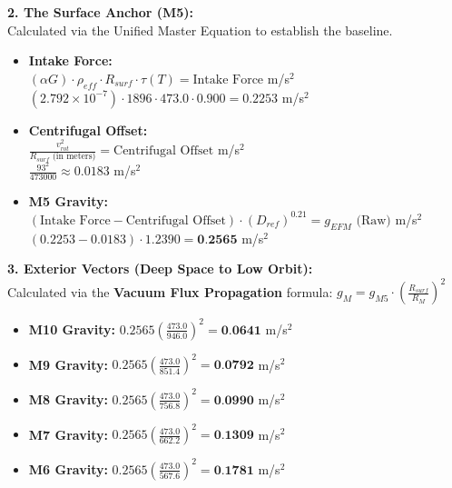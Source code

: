 \documentclass[11pt, a4paper]{article}
\begin{document}
  \vspace{1.0em}
  \noindent \textbf{2. The Surface Anchor (M5):} \\
  \hspace*{1em} Calculated via the Unified Master Equation to establish the baseline.
  \begin{itemize}
    \item \textbf{Intake Force:} \\[0.5em]
    \hspace*{2em} $(\alpha G) \cdot \rho_{eff} \cdot R_{surf} \cdot \tau(T) = \text{Intake Force}$ m/s$^2$ \\[1em]
    \hspace*{2em} $(2.792 \times 10^{-7}) \cdot 1896 \cdot 473.0 \cdot 0.900 = 0.2253$ m/s$^2$
    
    \item \textbf{Centrifugal Offset:} \\[0.5em]
    \hspace*{2em} $\frac{v_{rot}^2}{R_{surf} \text{ (in meters)}} = \text{Centrifugal Offset}$ m/s$^2$ \\[1em]
    \hspace*{2em} $\frac{93^2}{473000} \approx 0.0183$ m/s$^2$
    
    \item \textbf{M5 Gravity:} \\[0.5em]
    \hspace*{2em} $(\text{Intake Force} - \text{Centrifugal Offset}) \cdot (D_{ref})^{0.21} = g_{EFM} \text{ (Raw)}$ m/s$^2$ \\[1em]
    \hspace*{2em} $(0.2253 - 0.0183) \cdot 1.2390 = \textbf{0.2565}$ m/s$^2$
  \end{itemize}

  \clearpage
  \noindent \textbf{3. Exterior Vectors (Deep Space to Low Orbit):} \\
  \hspace*{1em} Calculated via the \textbf{Vacuum Flux Propagation} formula: $g_M = g_{M5} \cdot \left( \frac{R_{surf}}{R_M} \right)^2$
  \begin{itemize}
    \item \textbf{M10 Gravity:} $0.2565 \left( \frac{473.0}{946.0} \right)^2 = \textbf{0.0641}$ m/s$^2$
    \item \textbf{M9 Gravity:} $0.2565 \left( \frac{473.0}{851.4} \right)^2 = \textbf{0.0792}$ m/s$^2$
    \item \textbf{M8 Gravity:} $0.2565 \left( \frac{473.0}{756.8} \right)^2 = \textbf{0.0990}$ m/s$^2$
    \item \textbf{M7 Gravity:} $0.2565 \left( \frac{473.0}{662.2} \right)^2 = \textbf{0.1309}$ m/s$^2$
    \item \textbf{M6 Gravity:} $0.2565 \left( \frac{473.0}{567.6} \right)^2 = \textbf{0.1781}$ m/s$^2$
  \end{itemize}
\end{document}
